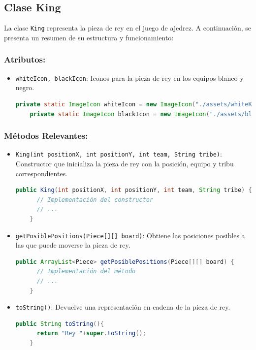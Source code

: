 \documentclass{article}
\begin{document}
\subsection{Clase King}
La clase \texttt{King} representa la pieza de rey en el juego de ajedrez. A continuación, se presenta un resumen de su estructura y funcionamiento:

\subsubsection{Atributos:}
\begin{itemize}
  \item \texttt{whiteIcon, blackIcon}: Iconos para la pieza de rey en los equipos blanco y negro.
  \begin{lstlisting}[language=java,caption={Atributos \texttt{whiteIcon} y \texttt{blackIcon} en la clase \texttt{King}}]
    private static ImageIcon whiteIcon = new ImageIcon("./assets/whiteKing.png");
    private static ImageIcon blackIcon = new ImageIcon("./assets/blackKing.png");
  \end{lstlisting}
\end{itemize}

\subsubsection{Métodos Relevantes:}
\begin{itemize}
  \item \texttt{King(int positionX, int positionY, int team, String tribe)}: Constructor que inicializa la pieza de rey con la posición, equipo y tribu correspondientes.
  \begin{lstlisting}[language=java,caption={Constructor \texttt{King} en la clase \texttt{King}}]
    public King(int positionX, int positionY, int team, String tribe) {
      // Implementación del constructor
      // ...
    }
  \end{lstlisting}

  \item \texttt{getPosiblePositions(Piece[][] board)}: Obtiene las posiciones posibles a las que puede moverse la pieza de rey.
  \begin{lstlisting}[language=java,caption={Método \texttt{getPosiblePositions} en la clase \texttt{King}}]
    public ArrayList<Piece> getPosiblePositions(Piece[][] board) {
      // Implementación del método
      // ...
    }
  \end{lstlisting}

  \item \texttt{toString()}: Devuelve una representación en cadena de la pieza de rey.
  \begin{lstlisting}[language=java,caption={Método \texttt{toString} en la clase \texttt{King}}]
    public String toString(){
      return "Rey "+super.toString();
    }
  \end{lstlisting}
\end{itemize}
\end{document}
